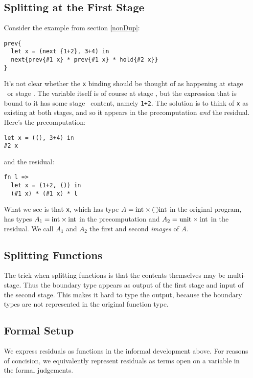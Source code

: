 \subsection {Splitting at the First Stage}

Consider the example from section \ref{nonDup}:

\begin{lstlisting} 
prev{
  let x = (next {1+2}, 3+4) in
  next{prev{#1 x} * prev{#1 x} * hold{#2 x}}
}
\end{lstlisting}

It's not clear whether the {\tt x} binding should be thought of as happening at stage \bbone\ or stage \bbtwo.
The variable itself is of course at stage \bbone, but the expression that is bound to it has some stage \bbtwo\ content, namely \verb|1+2|.
The solution is to think of {\tt x} as existing at both stages, and so it appears in the precomputation {\em and} the residual.
Here's the precomputation:
\begin{lstlisting} 
let x = ((), 3+4) in 
#2 x
\end{lstlisting}
and the residual:
\begin{lstlisting} 
fn l =>
  let x = (1+2, ()) in 
  (#1 x) * (#1 x) * l
\end{lstlisting}
What we see is that {\tt x}, which has type $A = {\rm int} \times \bigcirc {\rm int}$ in the original program, 
has types $A_1 = {\rm int} \times {\rm int}$ in the precomputation and $A_2 = {\rm unit} \times {\rm int}$ in the residual.
We call $A_1$ and $A_2$ the first and second {\em images} of $A$.

\subsection {Splitting Functions}

The trick when splitting functions is that the contents themselves may be multi-stage.
Thus the boundary type appears as output of the first stage and input of the second stage.
This makes it hard to type the output, because the boundary types are not represented in the original function type.

\subsection {Formal Setup}

We express residuals as functions in the informal development above.
For reasons of concision, we equivalently represent residuals as terms open on a variable in the formal judgements.

